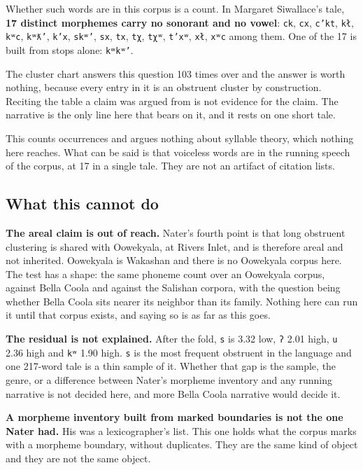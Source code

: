 Whether such words are in this corpus is a count. In Margaret Siwallace's tale, \textbf{17 distinct
morphemes carry no sonorant and no vowel}: \texttt{ck}, \texttt{cx}, \texttt{c'kt}, \texttt{kł},
\texttt{kʷc}, \texttt{kʷƛ'}, \texttt{k'x}, \texttt{skʷ'}, \texttt{sx}, \texttt{tx}, \texttt{tχ},
\texttt{tχʷ}, \texttt{t'xʷ}, \texttt{xł}, \texttt{xʷc} among them. One of the 17 is built from stops
alone: \texttt{kʷkʷ'}.

The cluster chart answers this question 103 times over and the answer is worth nothing, because
every entry in it is an obstruent cluster by construction. Reciting the table a claim was argued
from is not evidence for the claim. The narrative is the only line here that bears on it, and it
rests on one short tale.

This counts occurrences and argues nothing about syllable theory, which nothing here reaches. What can be
said is that voiceless words are in the running speech of the corpus, at 17 in a single tale. They are
not an artifact of citation lists.

\subsection{What this cannot do}

\textbf{The areal claim is out of reach.} Nater's fourth point is that long obstruent clustering is
shared with Oowekyala, at Rivers Inlet, and is therefore areal and not inherited. Oowekyala is
Wakashan and there is no Oowekyala corpus here. The test has a shape: the same phoneme count over an
Oowekyala corpus, against Bella Coola and against the Salishan corpora, with the question being
whether Bella Coola sits nearer its neighbor than its family. Nothing here can run it until that
corpus exists, and saying so is as far as this goes.

\textbf{The residual is not explained.} After the fold, \texttt{s} is 3.32 low, \texttt{ʔ} 2.01
high, \texttt{u} 2.36 high and \texttt{kʷ} 1.90 high. \texttt{s} is the most frequent obstruent in
the language and one 217-word tale is a thin sample of it. Whether that gap is the sample, the
genre, or a difference between Nater's morpheme inventory and any running narrative is not decided
here, and more Bella Coola narrative would decide it.

\textbf{A morpheme inventory built from marked boundaries is not the one Nater had.} His was a
lexicographer's list. This one holds what the corpus marks with a morpheme boundary, without duplicates.
They are the same kind of object and they are not the same object.

